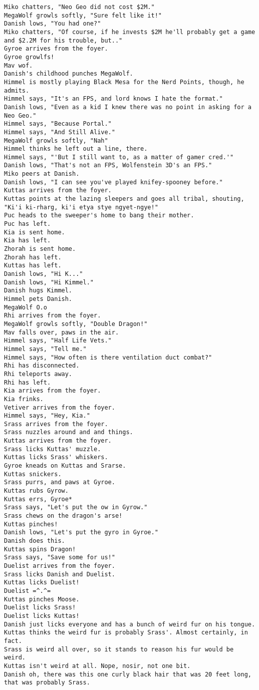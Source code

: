 \begin{verbatim}
Miko chatters, "Neo Geo did not cost $2M."
MegaWolf growls softly, "Sure felt like it!"
Danish lows, "You had one?"
Miko chatters, "Of course, if he invests $2M he'll probably get a game and $2.2M for his trouble, but.."
Gyroe arrives from the foyer.
Gyroe growlfs!
Mav wof.
Danish's childhood punches MegaWolf.
Himmel is mostly playing Black Mesa for the Nerd Points, though, he admits.
Himmel says, "It's an FPS, and lord knows I hate the format."
Danish lows, "Even as a kid I knew there was no point in asking for a Neo Geo."
Himmel says, "Because Portal."
Himmel says, "And Still Alive."
MegaWolf growls softly, "Nah"
Himmel thinks he left out a line, there.
Himmel says, "'But I still want to, as a matter of gamer cred.'"
Danish lows, "That's not an FPS, Wolfenstein 3D's an FPS."
Miko peers at Danish.
Danish lows, "I can see you've played knifey-spooney before."
Kuttas arrives from the foyer.
Kuttas points at the lazing sleepers and goes all tribal, shouting, "Ki'i ki-rharg, ki'i etya stye ngyet-ngye!"
Puc heads to the sweeper's home to bang their mother.
Puc has left.
Kia is sent home.
Kia has left.
Zhorah is sent home.
Zhorah has left.
Kuttas has left.
Danish lows, "Hi K..."
Danish lows, "Hi Kimmel."
Danish hugs Kimmel.
Himmel pets Danish.
MegaWolf O.o
Rhi arrives from the foyer.
MegaWolf growls softly, "Double Dragon!"
Mav falls over, paws in the air.
Himmel says, "Half Life Vets."
Himmel says, "Tell me."
Himmel says, "How often is there ventilation duct combat?"
Rhi has disconnected.
Rhi teleports away.
Rhi has left.
Kia arrives from the foyer.
Kia frinks.
Vetiver arrives from the foyer.
Himmel says, "Hey, Kia."
Srass arrives from the foyer.
Srass nuzzles around and and things.
Kuttas arrives from the foyer.
Srass licks Kuttas' muzzle.
Kuttas licks Srass' whiskers.
Gyroe kneads on Kuttas and Srarse.
Kuttas snickers.
Srass purrs, and paws at Gyroe.
Kuttas rubs Gyrow.
Kuttas errs, Gyroe*
Srass says, "Let's put the ow in Gyrow."
Srass chews on the dragon's arse!
Kuttas pinches!
Danish lows, "Let's put the gyro in Gyroe."
Danish does this.
Kuttas spins Dragon!
Srass says, "Save some for us!"
Duelist arrives from the foyer.
Srass licks Danish and Duelist.
Kuttas licks Duelist!
Duelist =^.^=
Kuttas pinches Moose.
Duelist licks Srass!
Duelist licks Kuttas!
Danish just licks everyone and has a bunch of weird fur on his tongue.
Kuttas thinks the weird fur is probably Srass'. Almost certainly, in fact.
Srass is weird all over, so it stands to reason his fur would be weird.
Kuttas isn't weird at all. Nope, nosir, not one bit.
Danish oh, there was this one curly black hair that was 20 feet long, that was probably Srass.

\end{verbatim}
